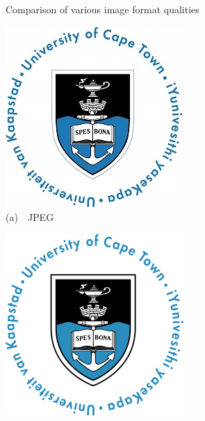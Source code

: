 \begin{FigureEnvironment}{Comparison of various image format qualities}%
  \label{fig:FigureQuality}%
  \hfill
  \begin{minipage}[b]{0.3\textwidth}\centering\setlength{\parindent}{0mm}
    \includegraphics[width=\textwidth]{../Figures/UCT.jpg}\\%
    {\small (a)~~JPEG}%
  \end{minipage}
  \hfill
  \begin{minipage}[b]{0.3\textwidth}\centering\setlength{\parindent}{0mm}
    \includegraphics[width=\textwidth]{../Figures/UCT.png}\\%

\end{minipage}
\end{FigureEnvironment}
